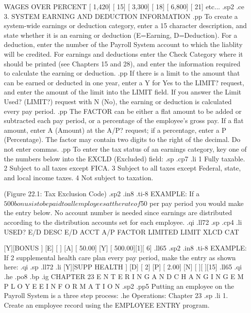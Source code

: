 	   WAGES OVER		 PERCENT
	 [	 1,420]      [		15]
	 [	 3,300]      [		18]
	 [	 6,800]      [		21]
	 etc...
.sp2
.ce
3. SYSTEM EARNING AND DEDUCTION INFORMATION
.pp
To create a system-wide earnings or deduction category, enter a 15
character description, and state whether it is an earning or deduction
(E=Earning, D=Deduction).  For a deduction,
enter the number of the Payroll System
account to which the liablity will be credited. For earnings and deductions
enter the
Check Category where it should be printed (see Chapters 15 and 28), and
enter the information required to calculate the earning or deduction.
.pp
If there is a limit to the amount that can be earned or deducted in
one year, enter a Y for Yes to the LIMIT? request, and enter the amount of the
limit into the LIMIT field.  If you answer the Limit Used? (LIMIT?) request
with N (No),
the earning or deduction is calculated every pay period.
.pp
The FACTOR can be either a flat amount to be added or subtracted
each pay period, or a percentage of the employee's gross pay.
If a flat amount, enter A (Amount)
at the A/P? request; if a percentage, enter a P (Percentage).  The factor
may contain two digits to the right of the decimal. Do not
enter commas.
.pp
To enter the tax status of an earnings category, key one of the numbers
below into the EXCLD (Excluded) field:
.sp
.cp7
.li
	1   Fully taxable.
	2   Subject to all taxes except FICA.
	3   Subject to all taxes except Federal,
	    state, and local income taxes.
	4   Not subject to taxation.

	 (Figure 22.1: Tax Exclusion Code)
.sp2
.in8
.ti-8
EXAMPLE: If a $500 bonus is to be paid to all employees at the rate
of $50 per pay period
you would make the entry below.  No account number is needed since
earnings are distributed according to the distribution accounts
set for each employee.
.qi
.ll72
.sp
.cp4
.li
USED? E/D DESC	   E/D	ACCT  A/P    FACTOR LIMITED  LIMIT XLCD CAT

 [Y][BONUS	 ] [E] [   ]  [A] [    50.00] [Y] [  500.00][1][ 6]
.ll65
.sp2
.in8
.ti-8
EXAMPLE: If 2%
supplemental health care plan every pay period, make the entry
as shown here:
.qi
.sp
.ll72
.li
[Y][SUPP HEALTH ] [D] [  2]  [P] [     2.00] [N] [	  ][  ][15]
.ll65
.qi
.he
.po8
.bp
.ig
CHAPTER 23
E N T E R I N G   A N D    C H A N G I N G
E M P L O Y E E    I N F O R M A T I O N
.sp2
.pp5
Putting an employee on the Payroll System is a three step process:
.he Operations: Chapter 23
.sp
.li
	1. Create an employee record using
	   the EMPLOYEE ENTRY program.

